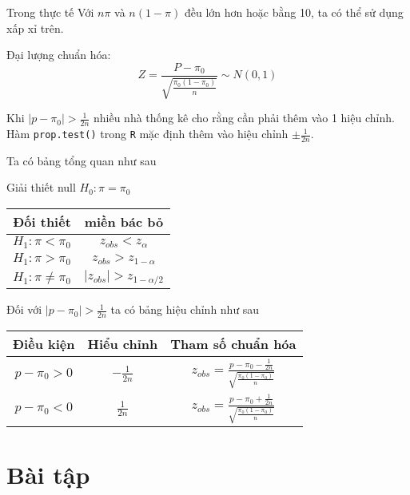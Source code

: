 Trong thực tế Với $n\pi$ và $n(1 - \pi)$ đều lớn hơn hoặc bằng 10, ta có thể sử dụng xấp xỉ trên.

Đại lượng chuẩn hóa:
\begin{equation}
    Z = \frac{P - \pi_0}{\sqrt{\frac{\pi_0(1 - \pi_0)}{n}}} \sim N(0, 1)
\end{equation}

Khi $|p - \pi_0| > \frac{1}{2n}$ nhiều nhà thống kê cho rằng cần phải thêm vào 1 hiệu chỉnh. 
Hàm \lstinline{prop.test()} trong \lstinline{R} mặc định thêm vào hiệu chỉnh $\pm \frac{1}{2n}$.

Ta có bảng tổng quan như sau

Giải thiết null $H_0: \pi = \pi_0$

\begin{center}
    \begin{tabular}{| c | c |}
        \hline
        Đối thiết & miền bác bỏ \\
        \hline
        $H_1: \pi < \pi_0$ & $z_{obs} < z_\alpha$ \\ 
        \hline 
        $H_1: \pi > \pi_0$ & $z_{obs} > z_{1 - \alpha}$ \\
        \hline
        $H_1: \pi \neq \pi_0$ & $|z_{obs}| > z_{1 - \alpha / 2}$ \\
        \hline
    \end{tabular}
\end{center}

Đối với $|p - \pi_0| > \frac{1}{2n}$ ta có bảng hiệu chỉnh như sau

\begin{center}
    \begin{tabular}{| c | c | c |}
        \hline
        Điều kiện & Hiểu chỉnh & Tham số chuẩn hóa\\
        \hline
        $p - \pi_0 > 0$ & $-\frac{1}{2n}$ & $z_{obs} = \frac{p - \pi_0 - 
        \frac{1}{2n}}{\sqrt{\frac{\pi_0(1 - \pi_0)}{n}}}$ \\ 
        \hline 
        $p - \pi_0 < 0$ & $\frac{1}{2n}$ & $z_{obs} = \frac{p - \pi_0 + 
        \frac{1}{2n}}{\sqrt{\frac{\pi_0(1 - \pi_0)}{n}}}$ \\ 
        \hline
    \end{tabular}
\end{center}

\section{Bài tập}

